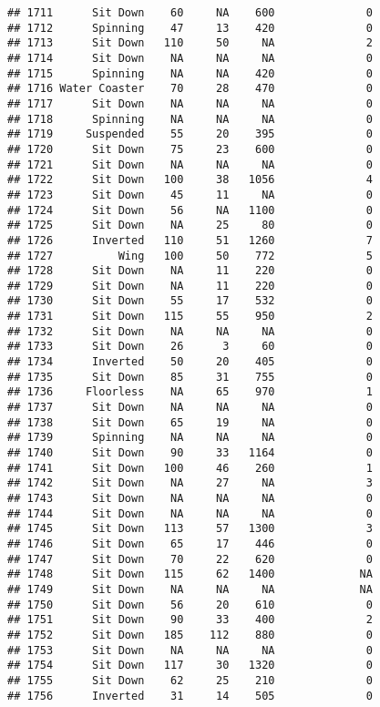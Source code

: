 \documentclass[
]{article}
\begin{document}
\begin{verbatim}
## 1711      Sit Down    60     NA    600              0
## 1712      Spinning    47     13    420              0
## 1713      Sit Down   110     50     NA              2
## 1714      Sit Down    NA     NA     NA              0
## 1715      Spinning    NA     NA    420              0
## 1716 Water Coaster    70     28    470              0
## 1717      Sit Down    NA     NA     NA              0
## 1718      Spinning    NA     NA     NA              0
## 1719     Suspended    55     20    395              0
## 1720      Sit Down    75     23    600              0
## 1721      Sit Down    NA     NA     NA              0
## 1722      Sit Down   100     38   1056              4
## 1723      Sit Down    45     11     NA              0
## 1724      Sit Down    56     NA   1100              0
## 1725      Sit Down    NA     25     80              0
## 1726      Inverted   110     51   1260              7
## 1727          Wing   100     50    772              5
## 1728      Sit Down    NA     11    220              0
## 1729      Sit Down    NA     11    220              0
## 1730      Sit Down    55     17    532              0
## 1731      Sit Down   115     55    950              2
## 1732      Sit Down    NA     NA     NA              0
## 1733      Sit Down    26      3     60              0
## 1734      Inverted    50     20    405              0
## 1735      Sit Down    85     31    755              0
## 1736     Floorless    NA     65    970              1
## 1737      Sit Down    NA     NA     NA              0
## 1738      Sit Down    65     19     NA              0
## 1739      Spinning    NA     NA     NA              0
## 1740      Sit Down    90     33   1164              0
## 1741      Sit Down   100     46    260              1
## 1742      Sit Down    NA     27     NA              3
## 1743      Sit Down    NA     NA     NA              0
## 1744      Sit Down    NA     NA     NA              0
## 1745      Sit Down   113     57   1300              3
## 1746      Sit Down    65     17    446              0
## 1747      Sit Down    70     22    620              0
## 1748      Sit Down   115     62   1400             NA
## 1749      Sit Down    NA     NA     NA             NA
## 1750      Sit Down    56     20    610              0
## 1751      Sit Down    90     33    400              2
## 1752      Sit Down   185    112    880              0
## 1753      Sit Down    NA     NA     NA              0
## 1754      Sit Down   117     30   1320              0
## 1755      Sit Down    62     25    210              0
## 1756      Inverted    31     14    505              0

\end{verbatim}
\end{document}
